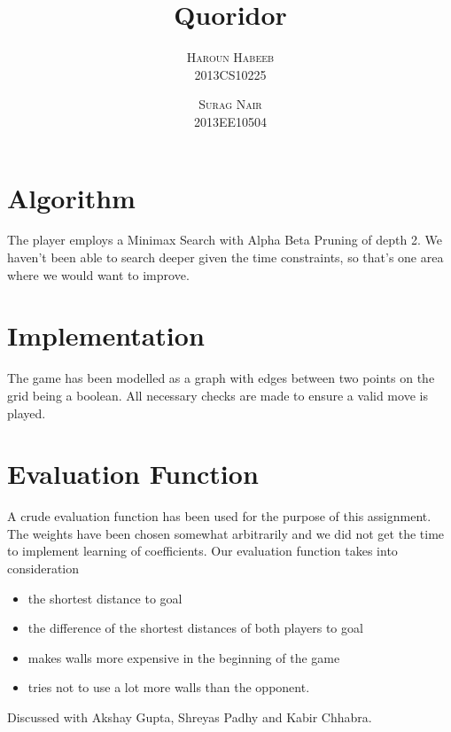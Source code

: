 \documentclass[twoside]{article}
\title{\vspace{-15mm}\fontsize{24pt}{10pt}\selectfont\textbf{Quoridor}} %
\date{}
\begin{document}
\author{
\textsc{Haroun Habeeb} \\{2013CS10225} \and \textsc{Surag Nair} \\{2013EE10504} 
}
\maketitle %
\thispagestyle{fancy} %
\section{Algorithm}
The player employs a Minimax Search with Alpha Beta Pruning of depth 2. We haven't been able to search deeper given the time constraints, so that's one area where we would want to improve.

\section{Implementation}
The game has been modelled as a graph with edges between two points on the grid being a boolean. All necessary checks are made to ensure a valid move is played.

\section{Evaluation Function}
A crude evaluation function has been used for the purpose of this assignment. The weights have been chosen somewhat arbitrarily and we did not get the time to  implement learning of coefficients. Our evaluation function takes into consideration 

\begin{itemize}
\item the shortest distance to goal

\item the difference of the shortest distances of both players to goal

\item makes walls more expensive in the beginning of the game

\item tries not to use a lot more walls than the opponent. 
\end{itemize}
\vspace{0.5cm}
Discussed with Akshay Gupta, Shreyas Padhy and Kabir Chhabra.


\end{document}
